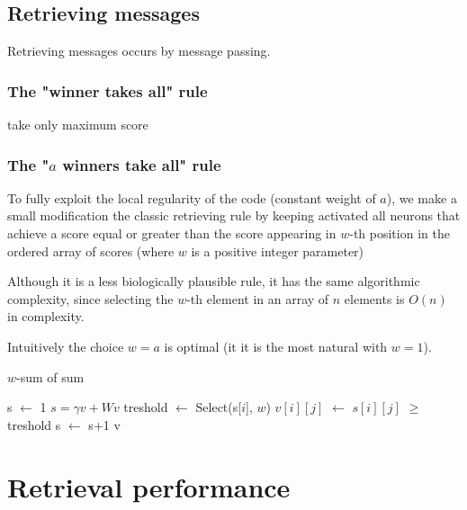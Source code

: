 \documentclass[english,11pt,twocolumn]{article}
\renewcommand{\le}{\leqslant}
\renewcommand{\ge}{\geqslant}
\newcommand*\Let[2]{\State #1 $\gets$ #2}
\theoremstyle{definition}
\begin{document}
	\subsection{Retrieving messages}	
		
		Retrieving messages occurs by message passing.		
		
		\subsubsection{The "winner takes all" rule}
		
		take only maximum score
	
		\subsubsection{The "$a$ winners take all" rule}
		

		To fully exploit the local regularity of the code (constant weight of $a$), we make a small modification the classic retrieving rule	by keeping activated all neurons that achieve a score equal or greater than the score appearing in $w$-th position in the ordered array of scores (where $w$ is a positive integer parameter)
		
		
		Although it is a less biologically plausible rule, it has the same algorithmic complexity, since selecting the $w$-th element in an array of $n$ elements is $O(n)$ in complexity.
		
		Intuitively the choice $w = a$ is optimal (it it is the most natural with $w = 1$).
		
		\begin{algorithm}
		\caption{$w$-sum of sum \label{asumsum}}
		
		\begin{algorithmic}[1]
		\Let{s}{1}
		\While{$s \le S$}
		\State $s = \gamma v + W v$
			\Let{treshold}{Select(s[$i$], $w$)} 
			\Let{$v[i][j]$}{$s[i][j]$ $\ge$ treshold}
			\EndFor
		\EndFor
		\Let{s}{s+1}
		\EndWhile
		\State\Return v
		\EndProcedure
		\end{algorithmic}
		\end{algorithm}

	\section{Retrieval performance}	
	
\end{document}
